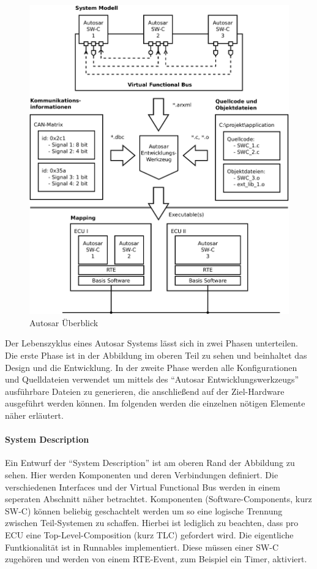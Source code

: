 \documentclass[
  a4paper,					    %
  twoside,
  DIV=calc,     				%
  bibliography=totoc,
  cleardoublepage=empty,
  ngerman,     					%
  final       					%
]{scrbook}
\begin{document}
\begin{figure}[h]
    \centering
    \includegraphics[width=1\textwidth]{autosar_overview.png}
    \caption{Autosar Überblick}
    \label{fig:autosar_overview}
\end{figure}

Der Lebenszyklus eines Autosar Systems lässt sich in zwei Phasen unterteilen. Die erste Phase ist in der Abbildung im oberen Teil zu sehen und beinhaltet das Design und die Entwicklung. In der zweite Phase werden alle Konfigurationen und Quelldateien verwendet um mittels des "`Autosar Entwicklungswerkzeugs"'  ausführbare Dateien zu generieren, die anschließend auf der Ziel-Hardware ausgeführt werden können. Im folgenden werden die einzelnen nötigen Elemente näher erläutert.


\paragraph{System Description} Ein Entwurf der "`System Description"' ist am oberen Rand der Abbildung zu sehen. Hier werden Komponenten und deren Verbindungen definiert. Die verschiedenen Interfaces und der Virtual Functional Bus werden in einem seperaten Abschnitt näher betrachtet. Komponenten (Software-Components, kurz SW-C) können beliebig geschachtelt werden um so eine logische Trennung zwischen Teil-Systemen zu schaffen. Hierbei ist lediglich zu beachten, dass pro ECU eine Top-Level-Composition (kurz TLC) gefordert wird. Die eigentliche Funtkionalität ist in Runnables implementiert. Diese müssen einer SW-C zugehören und werden von einem RTE-Event, zum Beispiel ein Timer, aktiviert.
\end{document}
